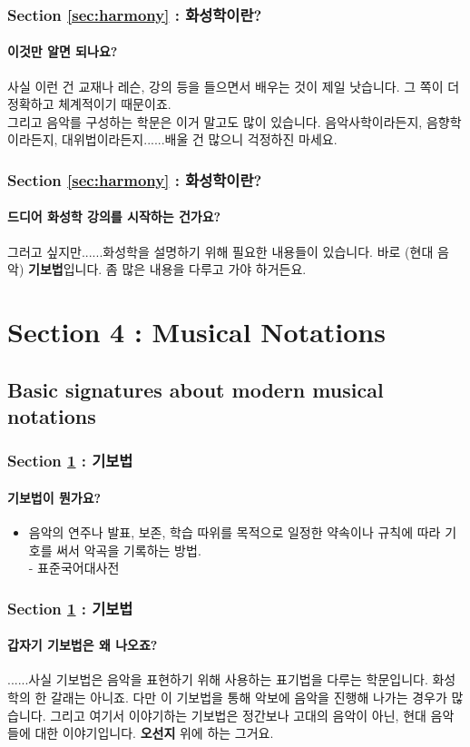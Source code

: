 \documentclass{beamer}
\begin{document}
	\begin{frame}
		\frametitle{Section \ref{sec:harmony} : 화성학이란?}
		\framesubtitle{이것만 알면 되나요?}
		사실 이런 건 교재나 레슨, 강의 등을 들으면서 배우는 것이 제일 낫습니다. 그 쪽이 더 정확하고 체계적이기 때문이죠.\\
		그리고 음악를 구성하는 학문은 이거 말고도 많이 있습니다. 음악사학이라든지, 음향학이라든지, 대위법이라든지......배울 건 많으니 걱정하진 마세요.
	\end{frame}
	
	\begin{frame}
		\frametitle{Section \ref{sec:harmony} : 화성학이란?}
		\framesubtitle{드디어 화성학 강의를 시작하는 건가요?}
		그러고 싶지만......화성학을 설명하기 위해 필요한 내용들이 있습니다. 바로 (현대 음악) {\bf 기보법}입니다. 좀 많은 내용을 다루고 가야 하거든요.
	\end{frame}
	
	\section{Section 4 : Musical Notations}\label{sec:notations}
	\subsection{Basic signatures about modern musical notations}
	\begin{frame}
		\frametitle{Section \ref{sec:notations} : 기보법}
		\framesubtitle{기보법이 뭔가요?}
		\begin{definition}%
			\begin{itemize}
				\item 음악의 연주나 발표, 보존, 학습 따위를 목적으로 일정한 약속이나 규칙에 따라 기호를 써서 악곡을 기록하는 방법. \\- 표준국어대사전
			\end{itemize}
		\end{definition}
	\end{frame}
	
	\begin{frame}
		\frametitle{Section \ref{sec:notations} : 기보법}
		\framesubtitle{갑자기 기보법은 왜 나오죠?}
		......사실 기보법은 음악을 표현하기 위해 사용하는 표기법을 다루는 학문입니다. 화성학의 한 갈래는 아니죠. 다만 이 기보법을 통해 악보에 음악을 진행해 나가는 경우가 많습니다. 그리고 여기서 이야기하는 기보법은 정간보나 고대의 음악이 아닌, 현대 음악들에 대한 이야기입니다. {\bf 오선지} 위에 하는 그거요.
	\end{frame}
	
\end{document}
